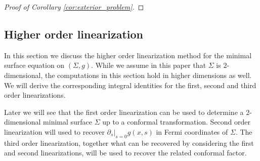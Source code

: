 \documentclass[12pt]{amsart}
\def\p{\partial}
\theoremstyle{definition}
\theoremstyle{remark}
\begin{document}
\begin{proof}[Proof of Corollary \ref{cor:exterior_problem}]
%  
\end{proof}




\subsection{Higher order linearization}\label{ss2.4}


In this section we discuss the higher order linearization method for the minimal surface equation on $(\Sigma,g)$. While we assume in this paper that $\Sigma$ is $2$-dimensional, the computations in this section hold in higher dimensions as well. We will derive the corresponding integral identities for the first, second and third order linearizations. 

Later we will see that the first order linearization can be used to determine a $2$-dimensional minimal surface $\Sigma$ up to a conformal transformation.  Second order linearization will used to recover $\p_s|_{s=0}g(x,s)$ in Fermi coordinates of $\Sigma$. The third order linearization, together what can be recovered by considering the first and second linearizations, will be used to recover the related conformal factor. 
\end{document}
